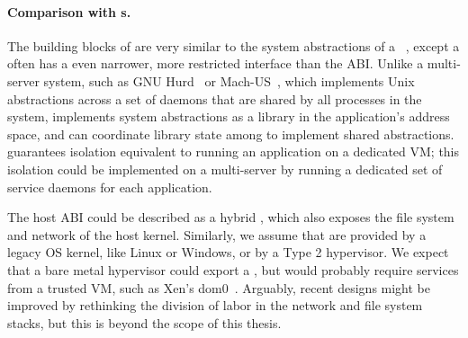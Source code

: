 \paragraph{Comparison with \microkernel{}s.}
The building blocks of \sysname{} are very similar to the system abstractions of a 
\microkernel{}~\citep{liedtke95sosp,klein09sel4,elphinstone13microkernels,liedtke93sosp,chen93memory,Baron:1985:MOE,Accetta:1986:MNK},
except a \microkernel{} often has a even narrower, more restricted interface
than the \pal{} ABI.
Unlike a multi-server \microkernel{} system, such as GNU Hurd~\citep{hurd} or Mach-US~\citep{stevenson95mach-us},
which implements Unix abstractions across a set of daemons that are shared by all processes in the system,
\sysname{} implements system abstractions as a library in the application's address space,
and can coordinate library state among \picoprocs{} to implement shared abstractions.
\sysname{} guarantees isolation equivalent to running 
an application on a dedicated VM; this isolation could be implemented on a multi-server \microkernel{}
by running a dedicated set of service daemons for each application.


The \sysname{} host ABI could be described as a hybrid \microkernel{},
which also exposes the file system and network of the host kernel.
Similarly, we assume that \picoprocs{} are provided by a legacy OS kernel, like Linux or Windows,
or by a Type 2 hypervisor.  We expect that a bare metal hypervisor could export a \pal{},
but would probably require services from a trusted VM, such as Xen's dom0~\citep{barham03xen}.
Arguably, recent \libos{} designs might be improved by rethinking the division of labor in
the network and file system stacks, but this is beyond the scope of this thesis.

